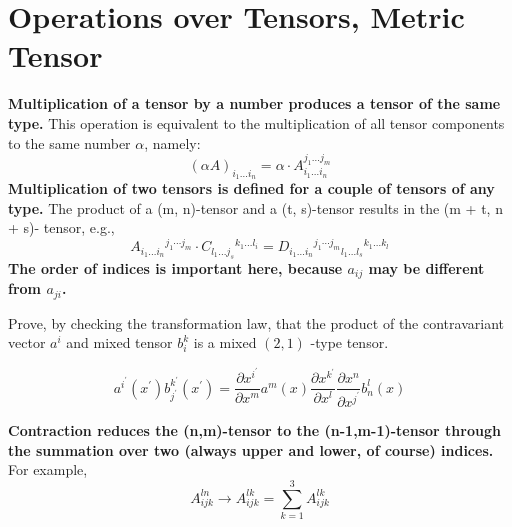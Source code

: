 \section{Operations over Tensors, Metric Tensor}
\textbf{Multiplication of a tensor by a number produces a tensor of the same type.} This operation is equivalent to the multiplication of all tensor components to the same number $\alpha$, namely:
\begin{equation}
(\alpha A)_{i_{1} \ldots i_{n}}=\alpha \cdot A_{i_{1} \ldots i_{n}}^{j_{1} \ldots j_{m}}
\end{equation}
\textbf{Multiplication of two tensors is defined for a couple of tensors of any type.} The product of a (m, n)-tensor and a (t, s)-tensor results in the (m + t, n + s)- tensor, e.g.,
\begin{equation}
A_{i_{1} \ldots i_{n}} {}^{j_1 \cdots j_{m}} \cdot C_{l_{1} \ldots j_{s}} {}^{k_1 \ldots l_{i}}=D_{i_{1} \ldots i_{n}} {}^{j_1 \cdots j_{m}} {}_{l_1 \ldots l_{s}}{}^{k_1 \ldots k_{l}}
\end{equation}
\textbf{The order of indices is important here, because $a_{i j}$ may be different from $a_{j i}$.}
\begin{example}
 Prove, by checking the transformation law, that the product of the contravariant vector $a^{i}$ and mixed tensor $b_{i}^{k}$ is a mixed $(2,1)$ -type tensor.
 
$$
a^{i^{\prime}}\left(x^{\prime}\right) b_{j^{\prime}}^{k^{\prime}}\left(x^{\prime}\right)=\frac{\partial x^{i^{\prime}}}{\partial x^{m}} a^{m}(x) \frac{\partial x^{k^{\prime}}}{\partial x^{l}} \frac{\partial x^{n}}{\partial x^{j^{\prime}}} b_{n}^{l}(x)
$$
\end{example}
\textbf{Contraction reduces the (n,m)-tensor to the (n-1,m-1)-tensor through the summation over two (always upper and lower, of course) indices.} For example,
\begin{equation}
A_{i j k}^{l n} \longrightarrow A_{i j k}^{l k}=\sum_{k=1}^{3} A_{i j k}^{l k}
\end{equation}

